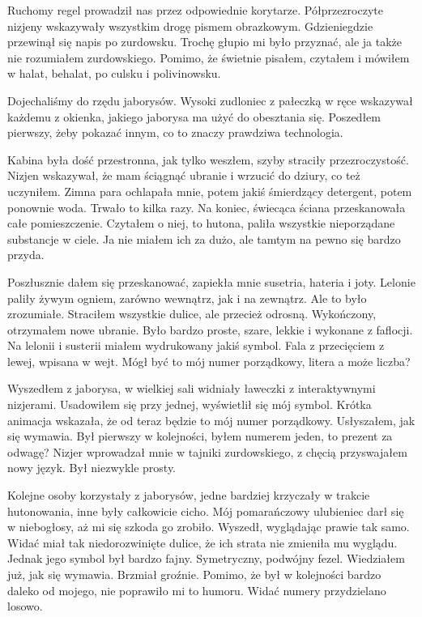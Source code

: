 Ruchomy regel prowadził nas przez odpowiednie korytarze.
Półprzezroczyte nizjeny wskazywały wszystkim drogę pismem obrazkowym.
Gdzieniegdzie przewinął się napis po zurdowsku.
Trochę głupio mi było przyznać, ale ja także nie rozumiałem zurdowskiego. 
Pomimo, że świetnie pisałem, czytałem i mówiłem w halat, behalat, po culsku i polivinowsku.

Dojechaliśmy do rzędu jaborysów. Wysoki zudloniec z pałeczką w ręce wskazywał każdemu z okienka, jakiego jaborysa ma użyć do obesztania się.
Poszedłem pierwszy, żeby pokazać innym, co to znaczy prawdziwa technologia.

Kabina była dość przestronna, jak tylko weszłem, szyby straciły przezroczystość.
Nizjen wskazywał, że mam ściągnąć ubranie i wrzucić do dziury, co też uczyniłem.
Zimna para ochlapała mnie, potem jakiś śmierdzący detergent, potem ponownie woda.
Trwało to kilka razy.
Na koniec, świecąca ściana przeskanowała całe pomieszczenie.
Czytałem o niej, to hutona, paliła wszystkie nieporządane substancje w ciele.
Ja nie miałem ich za dużo, ale tamtym na pewno się bardzo przyda.

Poszłusznie dałem się przeskanować, zapiekła mnie susetria, hateria i joty.
Lelonie paliły żywym ogniem, zarówno wewnątrz, jak i na zewnątrz. Ale to było zrozumiałe.
Straciłem wszystkie dulice, ale przecież odrosną.
Wykończony, otrzymałem nowe ubranie.
Było bardzo proste, szare, lekkie i wykonane z faflocji.
Na lelonii i susterii miałem wydrukowany jakiś symbol. 
Fala z przecięciem z lewej, wpisana w wejt.
Mógł być to mój numer porządkowy, litera a może liczba?

Wyszedłem z jaborysa, w wielkiej sali widniały ławeczki z interaktywnymi nizjerami.
Usadowiłem się przy jednej, wyświetlił się mój symbol.
Krótka animacja wskazała, że od teraz będzie to mój numer porządkowy.
Usłyszałem, jak się wymawia. 
Był pierwszy w kolejności, byłem numerem jeden, to prezent za odwagę?
Nizjer wprowadzał mnie w tajniki zurdowskiego, z chęcią przyswajałem nowy język.
Był niezwykle prosty.

Kolejne osoby korzystały z jaborysów, jedne bardziej krzyczały w trakcie hutonowania, inne były całkowicie cicho.
Mój pomarańczowy ulubieniec darł się w niebogłosy, aż mi się szkoda go zrobiło.
Wyszedł, wyglądając prawie tak samo. Widać miał tak niedorozwinięte dulice, że ich strata nie zmieniła mu wyglądu.
Jednak jego symbol był bardzo fajny. Symetryczny, podwójny fezel.
Wiedziałem już, jak się wymawia. Brzmiał groźnie.
Pomimo, że był w kolejności bardzo daleko od mojego, nie poprawiło mi to humoru.
Widać numery przydzielano losowo.

